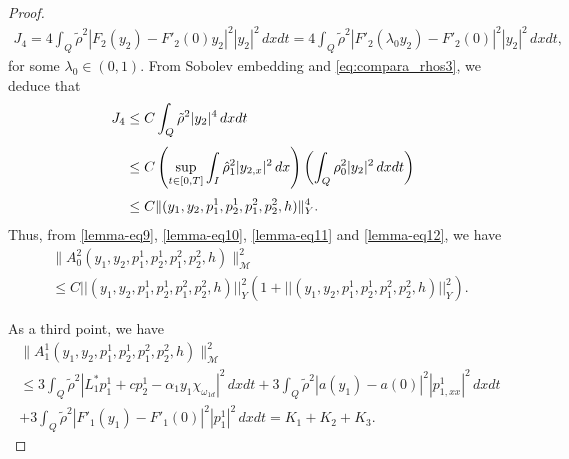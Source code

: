 \documentclass[11pt,a4paper]{amsart}
\numberwithin{equation}{section}
\begin{document}
\begin{proof}
$$\begin{array}{l}
        \displaystyle J_{4}= 4\int_{Q}\tilde{\rho}^{2}|F_{2}(y_{2})-F'_{2}(0)y_{2}|^{2}|y_{2}|^{2}\,dxdt
        =4\int_{Q}\tilde{\rho}^{2}|F'_{2}(\lambda_{0}y_{2})-F'_{2}(0)|^{2}|y_{2}|^{2}\,dxdt,
    \end{array}
    $$
    for some  $\lambda_{0}\in (0,1)$. From  Sobolev embedding and \eqref{eq:compara_rhos3}, we deduce that
    \begin{equation}\label{lemma-eq12}
    \begin{aligned}
\displaystyle J_{4}&\leq C\int_{Q}\tilde{\rho}^{2}|y_{2}|^{4}\,dxdt\\
        \noalign{\smallskip}\phantom{AA}
        \displaystyle &\leq C \left(\sup_{t\in [0,T]}\int_{I}\hat{\rho}^{2}_{1}|y_{2,x}|^{2}\,dx \right) \left(\int_{Q}\rho^{2}_{0}|y_{2}|^{2}\,dxdt \right)\\
        \noalign{\smallskip}\phantom{AA}
        &\leq C  \Vert(y_1,y_2,p^1_1,p^1_2,p^2_1,p^2_2,h)\Vert^{4}_{Y}.
    \end{aligned}
    \end{equation}Thus, from \eqref{lemma-eq9},  \eqref{lemma-eq10}, \eqref{lemma-eq11} and \eqref{lemma-eq12}, we  have
    \begin{equation}\label{lemma-eq13}
        \begin{array}{l}
    	   \parallel A_0^2 (y_1,y_2,p^1_1,p^1_2,p^2_1,p^2_2,h) \parallel^2_{\mathcal{M}}\\[1.0em]
    		 \leq C  ||(y_1,y_2,p^1_1,p^1_2,p^2_1,p^2_2,h)||^{2}_{Y}(1+ ||(y_1,y_2,p^1_1,p^1_2,p^2_1,p^2_2,h)||^{2}_{Y}).
    	\end{array}
    \end{equation}
    
    \noindent As a third point, we have
    $$
    \begin{array}{l}
        \displaystyle 	\parallel A_1^1 (y_1,y_2,p^1_1,p^1_2,p^2_1,p^2_2,h) \parallel^2_{\mathcal{M}}\\[1.0em]
     \leq  3 \displaystyle\int_{Q}\tilde{\rho}^{2}|L^{\ast}_{1}p^{1}_{1}+cp^{1}_{2}-\alpha_{1}y_{1}\chi_{\omega_{1d}}|^{2}\,dxdt +3\displaystyle\int_{Q}\tilde{\rho}^{2}|a(y_{1})-a(0)|^{2}|p^{1}_{1,xx}|^{2}\,dxdt\\[1.0em]
    	\displaystyle +3\int_{Q}\tilde{\rho}^{2}|F'_{1}(y_{1})-F'_{1}(0)|^{2}|p^{1}_{1}|^{2}\,dxdt =K_{1}+K_{2}+K_{3}.
    \end{array}
    $$
    

\end{proof}
\end{document}
